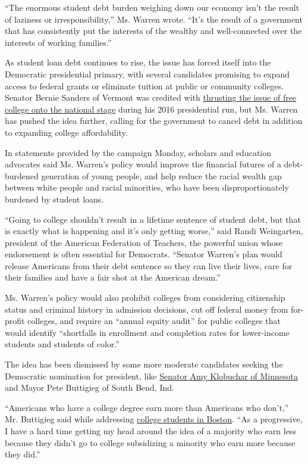 ``The enormous student debt burden weighing down our economy isn't the
result of laziness or irresponsibility,'' Ms. Warren wrote. ``It's the
result of a government that has consistently put the interests of the
wealthy and well-connected over the interests of working families.''

As student loan debt continues to rise, the issue has forced itself into
the Democratic presidential primary, with several candidates promising
to expand access to federal grants or eliminate tuition at public or
community colleges. Senator Bernie Sanders of Vermont was credited with
\href{https://www.nytimes3xbfgragh.onion/2017/02/03/education/edlife/bernie-sanders-on-free-tuition-campaign.html}{thrusting
the issue of free college onto the national stage} during his 2016
presidential run, but Ms. Warren has pushed the idea further, calling
for the government to cancel debt in addition to expanding college
affordability.

In statements provided by the campaign Monday, scholars and education
advocates said Ms. Warren's policy would improve the financial futures
of a debt-burdened generation of young people, and help reduce the
racial wealth gap between white people and racial minorities, who have
been disproportionately burdened by student loans.

``Going to college shouldn't result in a lifetime sentence of student
debt, but that is exactly what is happening and it's only getting
worse,'' said Randi Weingarten, president of the American Federation of
Teachers, the powerful union whose endorsement is often essential for
Democrats. ``Senator Warren's plan would release Americans from their
debt sentence so they can live their lives, care for their families and
have a fair shot at the American dream.''

Ms. Warren's policy would also prohibit colleges from considering
citizenship status and criminal history in admission decisions, cut off
federal money from for-profit colleges, and require an ``annual equity
audit'' for public colleges that would identify ``shortfalls in
enrollment and completion rates for lower-income students and students
of color.''

The idea has been dismissed by some more moderate candidates seeking the
Democratic nomination for president, like
\href{https://www.nytimes3xbfgragh.onion/2019/04/22/us/politics/amy-klobuchar-2020-president.html}{Senator
Amy Klobuchar of Minnesota} and Mayor Pete Buttigieg of South Bend, Ind.

``Americans who have a college degree earn more than Americans who
don't,'' Mr. Buttigieg said while addressing
\href{https://www.politico.com/story/2019/04/03/pete-buttigieg-northeastern-university-1254963}{college
students in Boston}. ``As a progressive, I have a hard time getting my
head around the idea of a majority who earn less because they didn't go
to college subsidizing a minority who earn more because they did.''

